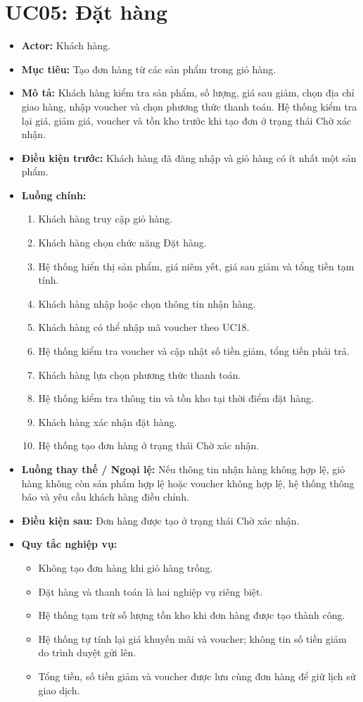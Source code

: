 \section{UC05: Đặt hàng}
\begin{itemize}
    \item \textbf{Actor:} Khách hàng.
    \item \textbf{Mục tiêu:} Tạo đơn hàng từ các sản phẩm trong giỏ hàng.
    \item \textbf{Mô tả:} Khách hàng kiểm tra sản phẩm, số lượng, giá sau giảm, chọn địa chỉ giao hàng, nhập voucher và chọn phương thức thanh toán. Hệ thống kiểm tra lại giá, giảm giá, voucher và tồn kho trước khi tạo đơn ở trạng thái Chờ xác nhận.
    \item \textbf{Điều kiện trước:} Khách hàng đã đăng nhập và giỏ hàng có ít nhất một sản phẩm.
    \item \textbf{Luồng chính:}
    \begin{enumerate}
        \item Khách hàng truy cập giỏ hàng.
        \item Khách hàng chọn chức năng Đặt hàng.
        \item Hệ thống hiển thị sản phẩm, giá niêm yết, giá sau giảm và tổng tiền tạm tính.
        \item Khách hàng nhập hoặc chọn thông tin nhận hàng.
        \item Khách hàng có thể nhập mã voucher theo UC18.
        \item Hệ thống kiểm tra voucher và cập nhật số tiền giảm, tổng tiền phải trả.
        \item Khách hàng lựa chọn phương thức thanh toán.
        \item Hệ thống kiểm tra thông tin và tồn kho tại thời điểm đặt hàng.
        \item Khách hàng xác nhận đặt hàng.
        \item Hệ thống tạo đơn hàng ở trạng thái Chờ xác nhận.
    \end{enumerate}
    \item \textbf{Luồng thay thế / Ngoại lệ:} Nếu thông tin nhận hàng không hợp lệ, giỏ hàng không còn sản phẩm hợp lệ hoặc voucher không hợp lệ, hệ thống thông báo và yêu cầu khách hàng điều chỉnh.
    \item \textbf{Điều kiện sau:} Đơn hàng được tạo ở trạng thái Chờ xác nhận.
    \item \textbf{Quy tắc nghiệp vụ:}
    \begin{itemize}
        \item Không tạo đơn hàng khi giỏ hàng trống.
        \item Đặt hàng và thanh toán là hai nghiệp vụ riêng biệt.
        \item Hệ thống tạm trừ số lượng tồn kho khi đơn hàng được tạo thành công.
        \item Hệ thống tự tính lại giá khuyến mãi và voucher; không tin số tiền giảm do trình duyệt gửi lên.
        \item Tổng tiền, số tiền giảm và voucher được lưu cùng đơn hàng để giữ lịch sử giao dịch.
    \end{itemize}
\end{itemize}

